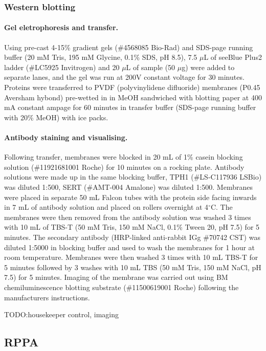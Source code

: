 \documentclass[a4paper,11pt,twoside,openright]{scrbook}
\begin{document}
\subsubsection{Western blotting}

\paragraph{Gel eletrophoresis and transfer.}
Using pre-cast 4-15\% gradient gels (\#4568085 Bio-Rad) and SDS-page running buffer (20 mM Tris, 195 mM Glycine, 0.1\% SDS, pH 8.5), 7.5 $\mu$L of seeBlue Plus2 ladder (\#LC5925 Invitrogen) and 20 $\mu$L of sample (50 $\mu$g) were added to separate lanes, and the gel was run at 200V constant voltage for 30 minutes.
Proteins were transferred to PVDF (polyvinylidene difluoride) membranes (P0.45 Aversham hybond) pre-wetted in in MeOH sandwiched with blotting paper at 400 mA constant ampage for 60 minutes in transfer buffer (SDS-page running buffer with 20\% MeOH) with ice packs.



\paragraph{Antibody staining and visualising.}
Following transfer, membranes were blocked in 20 mL of 1\% casein blocking solution (\#11921681001 Roche) for 10 minutes on a rocking plate.
Antibody solutions were made up in the same blocking buffer, TPH1 (\#LS-C117936 LSBio) was diluted 1:500, SERT (\#AMT-004 Amalone) was diluted 1:500.
Membranes were placed in separate 50 mL Falcon tubes with the protein side facing inwards in 7 mL of antibody solution and placed on rollers overnight at 4$^\circ$C.
The membranes were then removed from the antibody solution was washed 3 times with 10 mL of TBS-T (50 mM Tris, 150 mM NaCl, 0.1\% Tween 20, pH 7.5) for 5 minutes.
The secondary antibody (HRP-linked anti-rabbit IGg \#70742 CST) was diluted 1:5000 in blocking buffer and used to wash the membranes for 1 hour at room temperature.
Membranes were then washed 3 times with 10 mL TBS-T for 5 minutes followed by 3 washes with 10 mL TBS (50 mM Tris, 150 mM NaCl, pH 7.5) for 5 minutes.
Imaging of the membrane was carried out using BM chemiluminescence blotting substrate (\#11500619001 Roche) following the manufacturers instructions.

TODO:housekeeper control, imaging


\subsection{RPPA}
\end{document}
